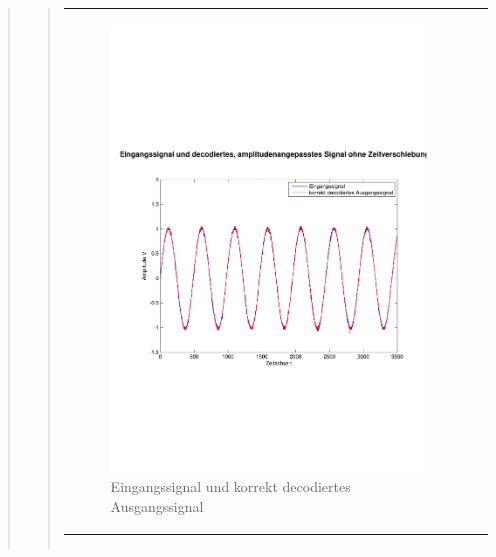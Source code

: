 \begin{quote}
\begin{quote}
\begin{center}
\begin{tabular}{ll}
                \begin{minipage}{0.6\textwidth}
                    \begin{figure}[H]
                        \includegraphics[scale=0.4, trim = 0cm 7cm 0cm
                        7.5cm, clip]
                        {./Bilder/sin100_Eingang_vs_korrektDecodiert}
                          \caption{Eingangssignal und korrekt decodiertes
                          Ausgangssignal}
                    \end{figure}
                \end{minipage}
            
            \end{tabular}
        \end{center}
        
        
        
        \begin{center}
            \begin{tabular}{ll}
            

\end{tabular}
\end{center}
\end{quote}
\end{quote}
